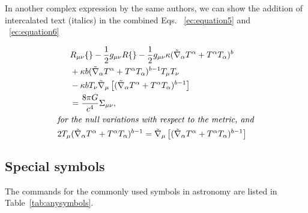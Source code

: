 \documentclass[9pt,article,twoside]{rmaa-rho-class/rmaa-rho}
\begin{document}
    In another complex expression by the same authors, we can show the addition of intercalated text (italics) in the combined Eqs. ~\ref{ec:equation5} and ~\ref{ec:equation6}

    \begin{gather}
	\begin{split}
		&R_{\mu\nu}\{\}-\frac{1}{2}g_{\mu\nu}R\{\}
			-\frac{1}{2}g_{\mu\nu}\kappa(\tilde{\nabla}_\alpha
			T^\alpha+ T^\alpha T_\alpha)^b\\
		&+\kappa b(\tilde{\nabla}_\alpha T^\alpha+T^\alpha
			T_\alpha)^{b-1}T_\mu T_\nu \\ 
	        & -\kappa bT_\nu \tilde{\nabla}_\mu\left[(\tilde{\nabla}_\alpha
			T^\alpha+ T^\alpha T_\alpha)^{b-1}\right]\\
		&=\frac{8\pi G}{c^4} \Sigma_{\mu\nu},
	\end{split}
	\label{ec:equation5}
	\\
	\intertext{\textit{for the null variations with respect to the metric, and}}
	2T_\mu(\tilde{\nabla}_\alpha T^\alpha+ T^\alpha T_\alpha)^{b-1}=
		\tilde{\nabla}_\mu\left[(\tilde{\nabla}_\alpha T^\alpha+ T^\alpha T_\alpha)^{b-1}\right]
	\label{ec:equation6}
    \end{gather}

    \subsection{Special symbols}

        The commands for the commonly used symbols in astronomy are listed in Table~\ref{tab:anysymbols}.
\end{document}
